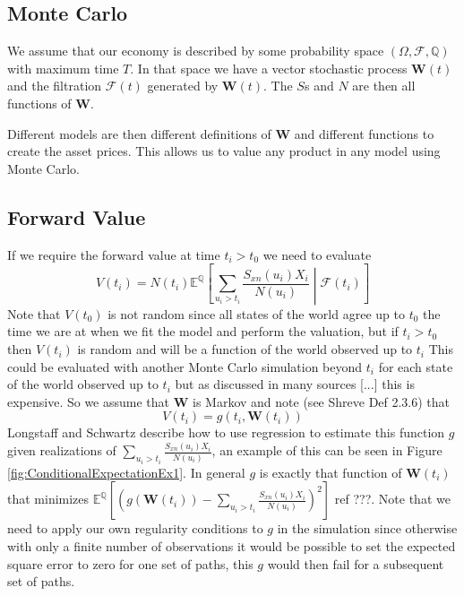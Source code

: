 \documentclass[a4paper,10pt]{article}
\newcommand{\E}{\mathbb{E}}                 %
\newcommand{\Q}{\mathbb{Q}}                 %
\begin{document}
\subsection{Monte Carlo}
We assume that our economy is described by some probability space $(\Omega, \mathcal{F}, \Q)$ with maximum time $T$.  In that space we have a vector stochastic process $\textbf{W}(t)$ and the filtration $\mathcal{F}(t)$ generated by $\textbf{W}(t)$.  The $S$s and $N$ are then all functions of $\textbf{W}$.

Different models are then different definitions of $\textbf{W}$ and different functions to create the asset prices.  
This allows us to value any product in any model using Monte Carlo.

\subsection{Forward Value}
If we require the forward value at time $t_i > t_0$ we need to evaluate
\begin{equation}
V(t_i) = N(t_i)\E^\Q\left[ \sum_{u_i>t_i}{\frac{S_{xn}(u_i)X_i}{N(u_i)}} \middle| \mathcal{F}(t_i) \right]
\label{eq:fwdvalue1}
\end{equation}
Note that $V(t_0)$ is not random since all states of the world agree up to $t_0$ the time we are at when we fit the model and perform the valuation, but if $t_i>t_0$ then $V(t_i)$ is random and will be a function of the world observed up to $t_i$
This could be evaluated with another Monte Carlo simulation beyond $t_i$ for each state of the world observed up to $t_i$ but as discussed in many sources [...] this is expensive.  So we assume that $\textbf{W}$ is Markov and note (see Shreve \cite{Shreve} Def 2.3.6) that 
\begin{equation}
V(t_i) = g(t_i, \textbf{W}(t_i))
\label{eq:regress}
\end{equation}
Longstaff and Schwartz \cite{Longstaff01valuingamerican} describe how to use regression to estimate this function $g$ given realizations of $\sum_{u_i>t_i}{\frac{S_{xn}(u_i)X_i}{N(u_i)}}$, an example of this can be seen in Figure \ref{fig:ConditionalExpectationEx1}.  In general $g$ is exactly that function of $\textbf{W}(t_i)$ that minimizes $\E^\Q\left[ \left(g(\textbf{W}(t_i)) - \sum_{u_i>t_i}{\frac{S_{xn}(u_i)X_i}{N(u_i)}} \right)^2 \right]$ ref ???. Note that we need to apply our own regularity conditions to $g$ in the simulation since otherwise with only a finite number of observations it would be possible to set the expected square error to zero for one set of paths, this $g$ would then fail for a subsequent set of paths.
\end{document}
